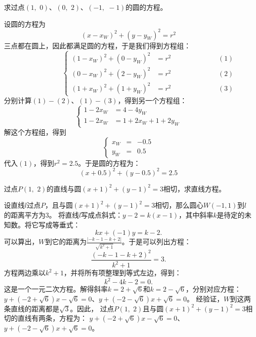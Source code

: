 \documentclass[12pt,UTF8,fontset=none]{ctexbook}
\begin{document}
\begin{et}
    求过点$(1, \,\, 0)$、$(0, \,\, 2)$、$(-1, \,\, -1)$的圆的方程。
\end{et}
\begin{so}
    设圆的方程为
    $$(x - x_W)^2 + (y - y_W)^2 = r^2$$
    三点都在圆上，因此都满足圆的方程，于是我们得到方程组：
    $$
    \qquad\qquad\qquad \left\{
    \begin{array}{llr}
        (1 - x_W)^2 + (0 - y_W)^2 &= r^2 &\qquad\qquad\qquad (1) \\
        (0 - x_W)^2 + (2 - y_W)^2 &= r^2 &\qquad\qquad\qquad (2) \\
        (1 + x_W)^2 + (1 + y_W)^2 &= r^2 &\qquad\qquad\qquad (3)
    \end{array}
    \right.
    $$
    分别计算$(1) - (2)$、$(1) - (3)$，得到另一个方程组：
    $$
    \left\{
    \begin{array}{ll}
        1 - 2x_W &= 4 - 4y_W \\
        1 - 2x_W &= 1 + 2x_W + 1 + 2y_W 
    \end{array}
    \right.
    $$  
    解这个方程组，得到
    $$
    \left\{
    \begin{array}{clr}
        x_W &=& -0.5 \\
        y_W &=& 0.5
    \end{array}
    \right.
    $$  
    代入$(1)$，得到$r^2 = 2.5$。于是圆的方程为：
    $$(x + 0.5)^2 + (y - 0.5)^2 = 2.5$$
\end{so}

\begin{et}
    过点$P(1, \,\, 2)$的直线与圆$(x + 1)^2 + (y - 1)^2 = 3$相切，求直线方程。
\end{et}
\begin{so}
设直线$l$过点$P$，且与圆$(x + 1)^2 + (y - 1)^2 = 3$相切，那么圆心$W(-1, 1)$到$l$的距离平方为$3$。
将直线$l$写成点斜式：$y - 2 = k(x - 1) $，其中斜率$k$是待定的未知数。将它写成等垂式：
$$kx + (-1)y = k - 2. $$
可以算出，$W$到它的距离为$\frac{|- k - 1 - k + 2|}{\sqrt{k^2 + 1}}$。于是可以列出方程：
$$\frac{(- k - 1 - k + 2)^2}{k^2 + 1} = 3.$$
方程两边乘以$k^2 + 1$，并将所有项整理到等式左边，得到：
$$ k^2 - 4k - 2 = 0.$$
这是一个一元二次方程。解得斜率$k = 2 + \sqrt{6}$和$k = 2 - \sqrt{6}$，分别对应方程：
$y + (- 2 + \sqrt{6}) x - \sqrt{6} = 0$、$y + (- 2 - \sqrt{6}) x + \sqrt{6} = 0$。
经验证，$W$到这两条直线的距离都是$\sqrt{3}$。因此，
过点$P(1, \,\, 2)$且与圆$(x + 1)^2 + (y - 1)^2 = 3$相切的直线有两条，方程为：
$y + (- 2 + \sqrt{6}) x - \sqrt{6} = 0$、$y + (- 2 - \sqrt{6}) x + \sqrt{6} = 0$。    
\end{so}
\end{document}
